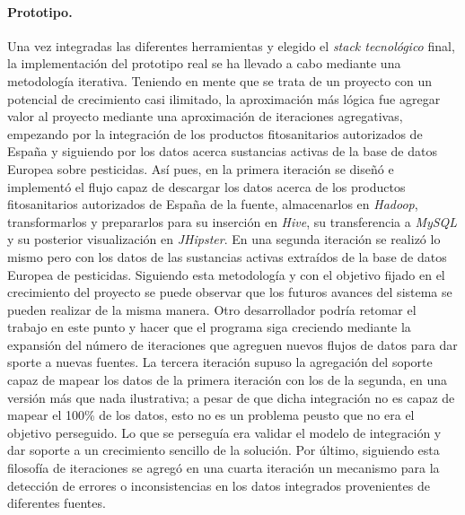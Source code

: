 \paragraph*{Prototipo.} Una vez integradas las diferentes herramientas y elegido el \textit{stack tecnológico} final, la implementación del prototipo real se ha llevado a cabo mediante una metodología iterativa. Teniendo en mente que se trata de un proyecto con un potencial de crecimiento casi ilimitado, la aproximación más lógica fue agregar valor al proyecto mediante una aproximación de iteraciones agregativas, empezando por la integración de los productos fitosanitarios autorizados de España y siguiendo por los datos acerca sustancias activas de la base de datos Europea sobre pesticidas.  Así pues, en la primera iteración se diseñó e implementó el flujo capaz de descargar los datos acerca de los productos fitosanitarios autorizados de España de la fuente, almacenarlos en \textit{Hadoop}, transformarlos y prepararlos para su inserción en \textit{Hive}, su transferencia a \textit{MySQL} y su posterior visualización en \textit{JHipster}. En una segunda iteración se realizó lo mismo pero con los datos de las sustancias activas extraídos de la base de datos Europea de pesticidas. Siguiendo esta metodología y con el objetivo fijado en el crecimiento del proyecto se puede observar que los futuros avances del sistema se pueden realizar de la misma manera. Otro desarrollador podría retomar el trabajo en este punto y hacer que el programa siga creciendo mediante la expansión del número de iteraciones que agreguen nuevos flujos de datos para dar sporte a nuevas fuentes. La tercera iteración supuso la agregación del soporte capaz de mapear los datos de la primera iteración con los de la segunda, en una versión más que nada ilustrativa; a pesar de que dicha integración no es capaz de mapear el 100\% de los datos, esto no es un problema peusto que no era el objetivo perseguido. Lo que se perseguía era validar el modelo de integración y dar soporte a un crecimiento sencillo de la solución. Por último, siguiendo esta filosofía de iteraciones se agregó en una cuarta iteración un mecanismo para la detección de errores o inconsistencias en los datos integrados provenientes de diferentes fuentes. 

